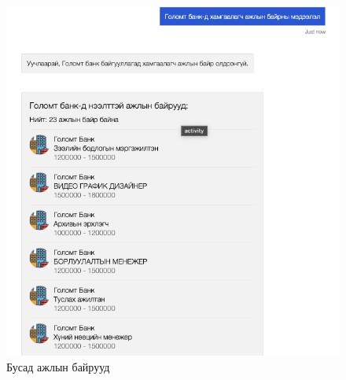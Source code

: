 \begin{figure}[ht]
  \includegraphics[width=\textwidth-4cm]{images/question1-2.png}
  \caption{Бусад ажлын байрууд} \label{fig:quest1-2}
\end{figure}
\newpage
